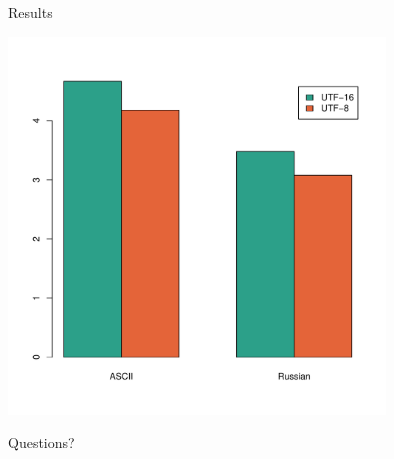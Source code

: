 \documentclass[20pt]{beamer}
\begin{document}
\begin{frame}{Results}
    \begin{center}
    \includegraphics[width=0.75\textwidth]{images/upper.pdf}
    \end{center}
\end{frame}

\begin{frame}[plain]
    \begin{center}
    \huge{Questions?}
    \end{center}
\end{frame}
\end{document}
